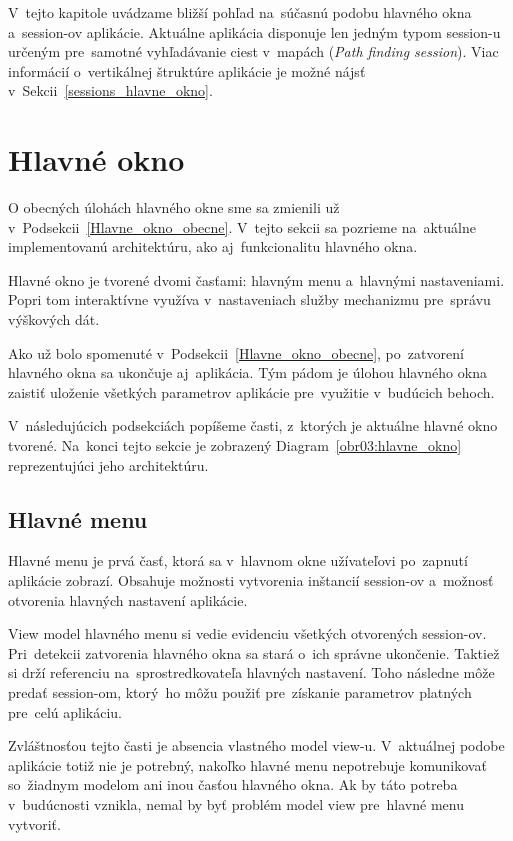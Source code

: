 
V~tejto kapitole uvádzame bližší pohľad na~súčasnú podobu hlavného okna a~session-ov aplikácie. Aktuálne aplikácia disponuje len jedným typom session-u určeným pre~samotné vyhľadávanie ciest v~mapách (\textit{Path finding session}). Viac informácií o~vertikálnej štruktúre aplikácie je možné nájsť v~Sekcii~\ref{sessions_hlavne_okno}.

\section{Hlavné okno}

O obecných úlohách hlavného okne sme sa zmienili už v~Podsekcii~\ref{Hlavne_okno_obecne}. V~tejto sekcii sa pozrieme na~aktuálne implementovanú architektúru, ako aj~funkcionalitu hlavného okna.


Hlavné okno je tvorené dvomi časťami: hlavným menu a~hlavnými nastaveniami.
Popri tom interaktívne využíva v~nastaveniach služby mechanizmu pre~správu výškových dát.

Ako už bolo spomenuté v~Podsekcii~\ref{Hlavne_okno_obecne}, po~zatvorení hlavného okna sa ukončuje aj~aplikácia. Tým pádom je úlohou hlavného okna zaistiť uloženie všetkých parametrov aplikácie pre~využitie v~budúcich behoch.

V~následujúcich podsekciách popíšeme časti, z~ktorých je aktuálne hlavné okno tvorené. Na~konci tejto sekcie je zobrazený Diagram~\ref{obr03:hlavne_okno} reprezentujúci jeho architektúru.

\subsection{Hlavné menu}

Hlavné menu je prvá časť, ktorá sa v~hlavnom okne užívateľovi po~zapnutí aplikácie zobrazí. Obsahuje možnosti vytvorenia inštancií session-ov a~možnosť otvorenia hlavných nastavení aplikácie. 

View model hlavného menu si vedie evidenciu všetkých otvorených session-ov. Pri~detekcii zatvorenia hlavného okna sa stará o~ich správne ukončenie. Taktiež si drží referenciu na~sprostredkovateľa hlavných nastavení. Toho následne môže predať session-om, ktorý~ho môžu použiť pre~získanie parametrov platných pre~celú aplikáciu.

Zvláštnosťou tejto časti je absencia vlastného model view-u. V~aktuálnej podobe aplikácie totiž nie je potrebný, nakoľko hlavné menu nepotrebuje komunikovať so~žiadnym modelom ani inou časťou hlavného okna. Ak by táto potreba v~budúcnosti vznikla, nemal by byť problém model view pre~hlavné menu vytvoriť. 

